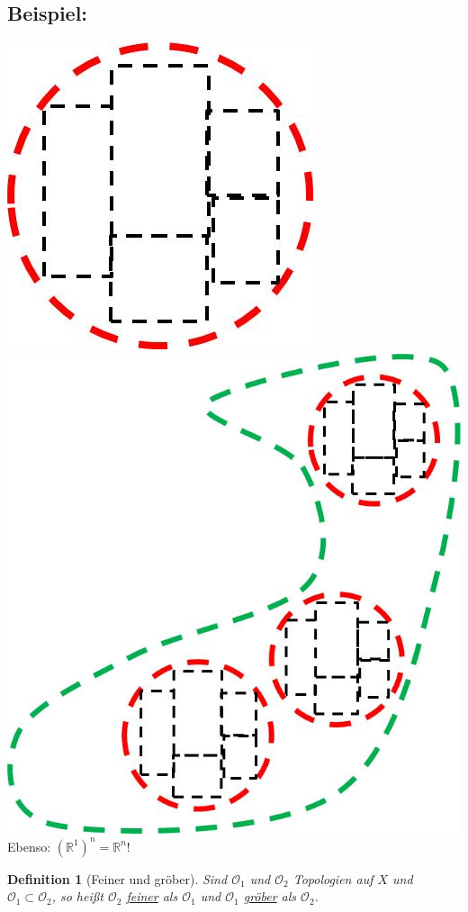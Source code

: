 \documentclass[a4paper,11pt,notitlepage]{report}
\newtheorem{definition}{Definition}[chapter]
\newcommand{\R}{{\ensuremath{\mathbb{R}}}}
\newcommand{\OO}{{\ensuremath{\mathcal{O}}}}
\newenvironment{bsp}[1]
{
\setlength{\fboxsep}{10pt}
\subsection*{Beispiel: #1}
\begin{upshape}
}
{
\end{upshape}
}
\begin{document}
\begin{bsp}{}
\includegraphics[scale=0.4]{images/Kreis_Rechteck.jpg} 
\includegraphics[scale=0.4]{images/Kreis_Rechteck_Basis.jpg} 
	Ebenso: $(\R^1)^n = \R^n$!
\end{bsp}

\begin{definition}[Feiner und gröber]
	Sind $\OO_1$ und $\OO_2$ Topologien auf $X$ und $\OO_1 \subset \OO_2$, 
	\newline so heißt $\OO_2$ \underline{feiner} als $\OO_1$ und $\OO_1$ \underline{gröber} als $\OO_2$.
\end{definition}
\end{document}
